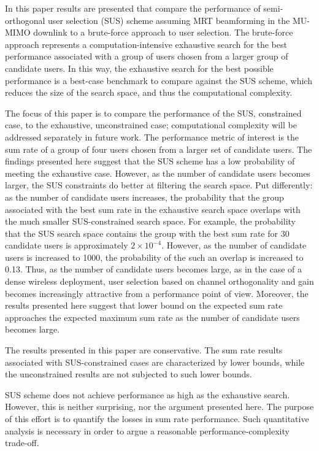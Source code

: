 In this paper results are presented that compare the performance of semi-orthogonal user selection (SUS) scheme assuming MRT beamforming in the MU-MIMO downlink to a brute-force approach to user selection. The brute-force approach represents a computation-intensive exhaustive search for the best performance associated with a group of users chosen from a larger group of candidate users. In this way, the exhaustive search for the best possible performance is a best-case benchmark to compare against the SUS scheme, which reduces the size of the search space, and thus the computational complexity.

The focus of this paper is to compare the performance of the SUS, constrained case, to the exhaustive, unconstrained case; computational complexity will be addressed separately in future work. The performance metric of interest is the sum rate of a group of four users chosen from a larger set of candidate users. The findings presented here suggest that the SUS scheme has a low probability of meeting the exhaustive case. However, as the number of candidate users becomes larger, the SUS constraints do better at filtering the search space. Put differently: as the number of candidate users increases, the probability that the group associated with the best sum rate in the exhaustive search space overlaps with the much smaller SUS-constrained search space. For example, the probability that the SUS search space contains the group with the best sum rate for 30 candidate users is approximately $2\times10^{-4}$. However, as the number of candidate users is increased to 1000, the probability of the such an overlap is increased to 0.13. Thus, as the number of candidate users becomes large, as in the case of a dense wireless deployment, user selection based on channel orthogonality and gain becomes increasingly attractive from a performance point of view. Moreover, the results presented here suggest that lower bound on the expected sum rate approaches the expected maximum sum rate as the number of candidate users becomes large.

The results presented in this paper are conservative. The sum rate results associated with SUS-constrained cases are characterized by lower bounds, while the unconstrained results are not subjected to such lower bounds. 

SUS scheme does not achieve performance as high as the exhaustive search. However, this is neither surprising, nor the argument presented here. The purpose of this effort is to quantify the losses in sum rate performance. Such quantitative analysis is necessary in order to argue a reasonable performance-complexity trade-off.